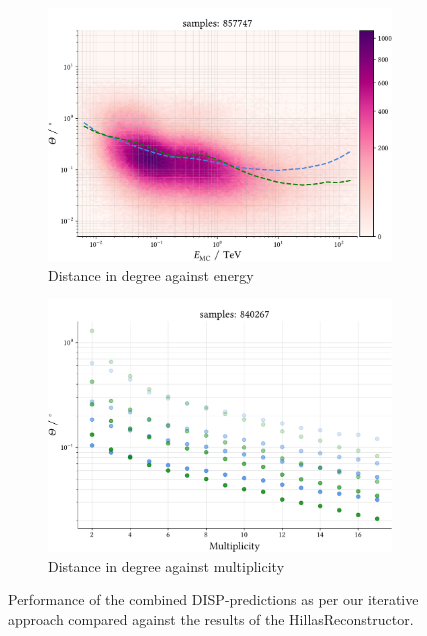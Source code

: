 \begin{figure}
    \centering
    \begin{subfigure}{0.75\textwidth}
        \includegraphics[width=\linewidth]{../analysis/plots/gamma/pairwise_median_100_vs_energy.pdf} 
        \caption{Distance in degree against energy}
    \end{subfigure}
    \begin{subfigure}{0.75\textwidth}
        \includegraphics[width=\linewidth]{../analysis/plots/gamma/pairwise_median_100_vs_multi_comp.pdf}
        \caption{Distance in degree against multiplicity}
    \end{subfigure}
    \caption{Performance of the combined DISP-predictions as per our iterative approach
    compared against the results of the HillasReconstructor.
}
\end{figure}
